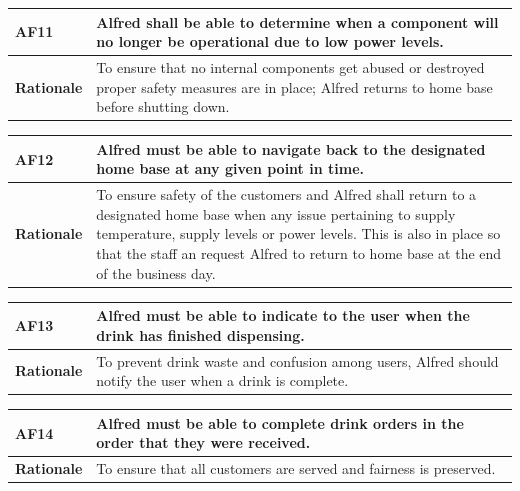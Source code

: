 \documentclass [11pt]{article}
\begin{document}
\begin{longtable}{| p{ } | p{ } | }\hline 
\rowcolor{tableCell}\textbf{AF11} & Alfred shall be able to determine when a component will no longer be operational due to low power levels. \\ \hline
\textbf{Rationale} &  To ensure that no internal components get abused or destroyed proper safety measures are in place; Alfred returns to home base before shutting down. \\ \hline
\end{longtable}

\begin{longtable}{| p{ } | p{ } | }\hline 
\rowcolor{tableCell}\textbf{AF12} & Alfred must be able to navigate back to the designated home base at any given point in time. \\ \hline
\textbf{Rationale} &  To ensure safety of the customers and Alfred shall return to a designated home base when any issue pertaining to supply temperature, supply levels or power levels. This is also in place so that the staff an request Alfred to return to home base at the end of the business day. \\ \hline
\end{longtable}

\begin{longtable}{| p{ } | p{ } | }\hline 
\rowcolor{tableCell}\textbf{AF13} & Alfred must be able to indicate to the user when the drink has finished dispensing. \\ \hline
\textbf{Rationale} &  To prevent drink waste and confusion among users, Alfred should notify the user when a drink is complete.\\ \hline 
\end{longtable}

\begin{longtable}{| p{ } | p{ } | }\hline 
\rowcolor{tableCell}\textbf{AF14} & Alfred must be able to complete drink orders in the order that they were received.\\ \hline
\textbf{Rationale} &  To ensure that all customers are served and fairness is preserved.\\ \hline 
\end{longtable}

\pagebreak

\end{document}

